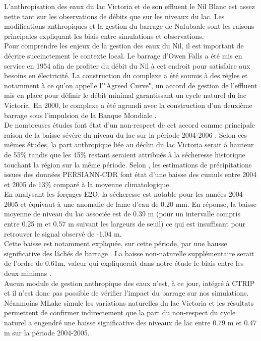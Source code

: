 L'anthropisation des eaux du lac Victoria et de son effluent le Nil Blanc est assez nette tant sur les observations de débits que sur les niveaux du lac. Les modifications anthropiques et la gestion du barrage de Nalubaale sont les raisons principales expliquant les biais entre simulations et observations. \\
Pour comprendre les enjeux de la gestion des eaux du Nil, il est important de décrire succinctement le contexte local. Le barrage d'Owen Falls a été mis en service en 1954 afin de profiter du débit du Nil à cet endroit pour satisfaire aux besoins en électricité. La construction du complexe a été soumis à des règles et notamment à ce qu'on appelle l'"Agreed Curve", un accord de gestion de l'effluent mis en place pour définir le débit minimal garantissant un cycle naturel du lac Victoria. En 2000, le complexe a été agrandi avec la construction d'un deuxième barrage sous l'impulsion de la Banque Mondiale \citep{kull2006}. \\
De nombreuses études font état d'un non-respect de cet accord comme principale raison de la baisse sévère du niveau du lac sur la période 2004-2006 \citep{kull2006, sutcliffe2007, vanderkelen2018a, getirana2020}. Selon ces mêmes études, la part anthropique liée au déclin du lac Victoria serait à hauteur de 55\% tandis que les 45\% restant seraient attribués à la sécheresse historique touchant la région sur la même période. Selon \citet{vanderkelen2018a}, les estimations de précipitations issues des données PERSIANN-CDR font état d'une baisse des cumuls entre 2004 et 2005 de 13\% comparé à la moyenne climatologique.\\

En analysant les forçages E2O, la sécheresse est notable pour les années 2004-2005 et équivaut à une anomalie de lame d'eau de 0.20 mm. En réponse, la baisse moyenne de niveau du lac associée est de 0.39 m (pour un intervalle compris entre 0.25 m et 0.57 m suivant les largeurs de seuil) ce qui est insuffisant pour retrouver le signal observé de -1.04 m.\\
Cette baisse est notamment expliquée, sur cette période, par une hausse significative des lâchés de barrage \citep{getirana2020}. La baisse non-naturelle supplémentaire serait de l'ordre de 0.61m, valeur qui expliquerait dans notre étude le biais entre les deux minimas \citep{sutcliffe2007}.\\

Aucun module de gestion anthropique des eaux n'est, à ce jour, intégré à CTRIP et il n'est donc pas possible de vérifier l'impact du barrage sur nos simulations. Néanmoins MLake simule les variations naturelles du lac Victoria et les résultats permettent de confirmer indirectement que la part du non-respect du cycle naturel a engendré une baisse significative des niveaux de lac entre 0.79 m et 0.47 m sur la période 2004-2005.

